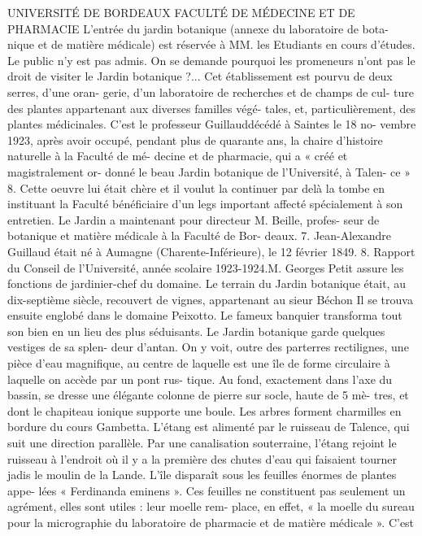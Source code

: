 \documentclass[a4paper,11pt]{book}
\begin{document}
UNIVERSITÉ DE BORDEAUX
FACULTÉ DE MÉDECINE ET DE PHARMACIE
L'entrée du jardin botanique (annexe du laboratoire de bota-
nique et de matière médicale) est réservée à MM. les Etudiants
en cours d'études.
Le public n'y est pas admis.
On se demande pourquoi les promeneurs n'ont pas le
droit de visiter le Jardin botanique ?...
Cet établissement est pourvu de deux serres, d'une oran-
gerie, d'un laboratoire de recherches et de champs de cul-
ture des plantes appartenant aux diverses familles végé-
tales, et, particulièrement, des plantes médicinales.
C'est le professeur Guillauddécédé à Saintes le 18 no-
vembre 1923, après avoir occupé, pendant plus de quarante
ans, la chaire d'histoire naturelle à la Faculté de mé-
decine et de pharmacie, qui a « créé et magistralement or-
donné le beau Jardin botanique de l'Université, à Talen-
ce » 8. Cette oeuvre lui était chère et il voulut la continuer
par delà la tombe en instituant la Faculté bénéficiaire d'un
legs important affecté spécialement à son entretien.
Le Jardin a maintenant pour directeur M. Beille, profes-
seur de botanique et matière médicale à la Faculté de Bor-
deaux.
7. Jean-Alexandre Guillaud était né à Aumagne (Charente-Inférieure),
le 12 février 1849.
8. Rapport du Conseil de l'Université, année scolaire 1923-1924.M. Georges Petit assure les fonctions de jardinier-chef
du domaine.
Le terrain du Jardin botanique était, au dix-septième
siècle, recouvert de vignes, appartenant au sieur Béchon
Il se trouva ensuite englobé dans le domaine Peixotto. Le
fameux banquier transforma tout son bien en un lieu des
plus séduisants.
Le Jardin botanique garde quelques vestiges de sa splen-
deur d'antan. On y voit, outre des parterres rectilignes,
une pièce d'eau magnifique, au centre de laquelle est une
île de forme circulaire à laquelle on accède par un pont rus-
tique. Au fond, exactement dans l'axe du bassin, se dresse
une élégante colonne de pierre sur socle, haute de 5 mè-
tres, et dont le chapiteau ionique supporte une boule. Les
arbres forment charmilles en bordure du cours Gambetta.
L'étang est alimenté par le ruisseau de Talence, qui suit
une direction parallèle. Par une canalisation souterraine,
l'étang rejoint le ruisseau à l'endroit où il y a la première
des chutes d'eau qui faisaient tourner jadis le moulin de
la Lande.
L'île disparaît sous les feuilles énormes de plantes appe-
lées « Ferdinanda eminens ». Ces feuilles ne constituent pas
seulement un agrément, elles sont utiles : leur moelle rem-
place, en effet, « la moelle du sureau pour la micrographie
du laboratoire de pharmacie et de matière médicale ». C'est
\end{document}
